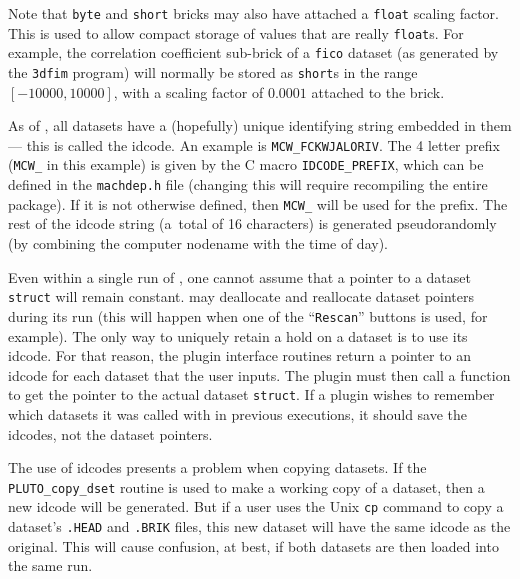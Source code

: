     Note that {\tt byte} and {\tt short} bricks may also have attached a
    {\tt float} scaling
    factor.  This is used to allow compact storage of values that are
    really {\tt float}s.  For example, the correlation coefficient sub-brick
    of a {\tt fico} dataset (as generated by the {\tt 3dfim} program) will normally
    be stored as {\tt short}s in the range $[-10000,10000]$, with a
    scaling factor of $0.0001$ attached to the brick.

    As of , all datasets have a (hopefully) unique identifying
    string embedded in them --- this is called the {\rm idcode}.
    An example is {\tt MCW\_FCKWJALORIV}.  The 4 letter prefix
    ({\tt MCW\_} in this example) is given by the C macro {\tt IDCODE\_PREFIX},
    which can be defined in the {\tt machdep.h} file (changing this will require
    recompiling the entire \mcwafni package).
    If it is not
    otherwise defined, then {\tt MCW\_} will be used for the prefix.
    The rest of the idcode string (a~total of 16 characters) is
    generated pseudorandomly (by combining the computer nodename with
    the time of day).

    Even within a single run of \afni, one cannot assume that a pointer
    to a dataset {\tt struct} will remain constant.  \afnit may deallocate
    and reallocate dataset pointers during its run (this will happen when
    one of the ``{\tt Rescan}'' buttons is used, for example).  The only way to
    uniquely retain a hold on a dataset is to use its idcode.  For that
    reason, the plugin interface routines return a pointer to an
    idcode for each dataset that the user inputs.  The plugin must
    then call a function to get the pointer to the actual dataset {\tt struct}.
    If a plugin wishes to remember which datasets it was called with
    in previous executions, it should save the idcodes, not the
    dataset pointers.

    The use of idcodes presents a problem when copying datasets.
    If the {\tt PLUTO\_copy\_dset} routine is used to make a
    working copy of a dataset, then a new idcode will be generated.
    But if a user uses the Unix {\tt cp} command to copy a dataset's
    {\tt .HEAD} and {\tt .BRIK} files, this new dataset will have the
    same idcode as the original.  This will cause confusion, at best,
    if both datasets are then loaded into the same \afnit run.

